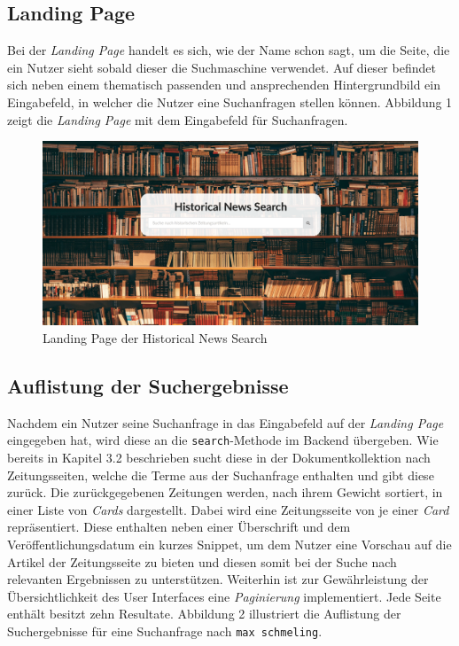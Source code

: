 \documentclass[11pt,a4paper, halfparskip]{scrartcl}
\begin{document}
\subsection{Landing Page}

Bei der \textit{Landing Page} handelt es sich, wie der Name schon sagt, um die Seite, die ein Nutzer sieht sobald dieser die Suchmaschine verwendet.
Auf dieser befindet sich neben einem thematisch passenden und ansprechenden Hintergrundbild ein Eingabefeld, in welcher die Nutzer eine Suchanfragen stellen können. 
Abbildung 1 zeigt die \textit{Landing Page} mit dem Eingabefeld für Suchanfragen.

\begin{figure}[h]
	\includegraphics[width=\linewidth]{images/landing_page.png}
	\caption{Landing Page der Historical News Search}
\end{figure}

\subsection{Auflistung der Suchergebnisse}

Nachdem ein Nutzer seine Suchanfrage in das Eingabefeld auf der \textit{Landing Page} eingegeben hat, wird diese an die \texttt{search}-Methode im Backend übergeben.
Wie bereits in Kapitel 3.2 beschrieben sucht diese in der Dokumentkollektion nach Zeitungsseiten, welche die Terme aus der Suchanfrage enthalten und gibt diese zurück. 
Die zurückgegebenen Zeitungen werden, nach ihrem Gewicht sortiert, in einer Liste von \textit{Cards} dargestellt.
Dabei wird eine Zeitungsseite von je einer \textit{Card} repräsentiert.
Diese enthalten neben einer Überschrift und dem Veröffentlichungsdatum ein kurzes Snippet, um dem Nutzer eine Vorschau auf die Artikel der Zeitungsseite zu bieten und diesen somit bei der Suche nach relevanten Ergebnissen zu unterstützen.
Weiterhin ist zur Gewährleistung der Übersichtlichkeit des User Interfaces eine \textit{Paginierung} implementiert.
Jede Seite enthält besitzt zehn Resultate. 
Abbildung 2 illustriert die Auflistung der Suchergebnisse für eine Suchanfrage nach \texttt{max schmeling}.
\end{document}
